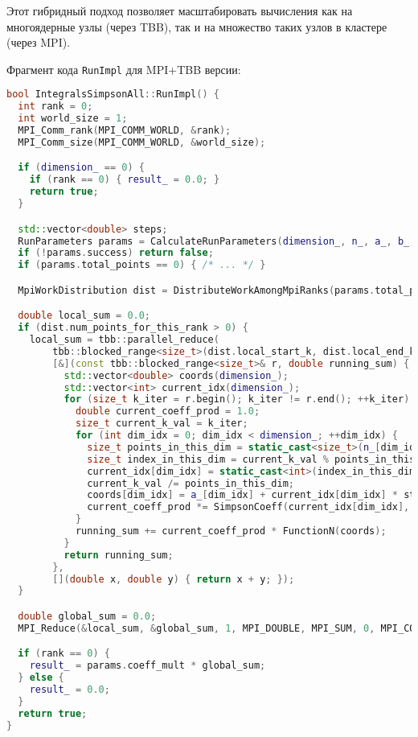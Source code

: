 \documentclass[a4paper,12pt]{article}
\begin{document}
Этот гибридный подход позволяет масштабировать вычисления как на многоядерные узлы (через TBB), так и на множество таких узлов в кластере (через MPI).

Фрагмент кода \texttt{RunImpl} для MPI+TBB версии:
\begin{lstlisting}[language=C++, caption=Фрагмент RunImpl для MPI+TBB-реализации (ops\_all.cpp), basicstyle=\ttfamily\scriptsize]
bool IntegralsSimpsonAll::RunImpl() {
  int rank = 0;
  int world_size = 1;
  MPI_Comm_rank(MPI_COMM_WORLD, &rank);
  MPI_Comm_size(MPI_COMM_WORLD, &world_size);

  if (dimension_ == 0) {
    if (rank == 0) { result_ = 0.0; }
    return true;
  }

  std::vector<double> steps;
  RunParameters params = CalculateRunParameters(dimension_, n_, a_, b_, steps);
  if (!params.success) return false;
  if (params.total_points == 0) { /* ... */ }

  MpiWorkDistribution dist = DistributeWorkAmongMpiRanks(params.total_points, rank, world_size);

  double local_sum = 0.0;
  if (dist.num_points_for_this_rank > 0) {
    local_sum = tbb::parallel_reduce(
        tbb::blocked_range<size_t>(dist.local_start_k, dist.local_end_k), 0.0,
        [&](const tbb::blocked_range<size_t>& r, double running_sum) {
          std::vector<double> coords(dimension_);
          std::vector<int> current_idx(dimension_);
          for (size_t k_iter = r.begin(); k_iter != r.end(); ++k_iter) {
            double current_coeff_prod = 1.0;
            size_t current_k_val = k_iter;
            for (int dim_idx = 0; dim_idx < dimension_; ++dim_idx) {
              size_t points_in_this_dim = static_cast<size_t>(n_[dim_idx]) + 1;
              size_t index_in_this_dim = current_k_val % points_in_this_dim;
              current_idx[dim_idx] = static_cast<int>(index_in_this_dim);
              current_k_val /= points_in_this_dim;
              coords[dim_idx] = a_[dim_idx] + current_idx[dim_idx] * steps[dim_idx];
              current_coeff_prod *= SimpsonCoeff(current_idx[dim_idx], n_[dim_idx]);
            }
            running_sum += current_coeff_prod * FunctionN(coords);
          }
          return running_sum;
        },
        [](double x, double y) { return x + y; });
  }

  double global_sum = 0.0;
  MPI_Reduce(&local_sum, &global_sum, 1, MPI_DOUBLE, MPI_SUM, 0, MPI_COMM_WORLD);

  if (rank == 0) {
    result_ = params.coeff_mult * global_sum;
  } else {
    result_ = 0.0;
  }
  return true;
}
\end{lstlisting}
\end{document}
